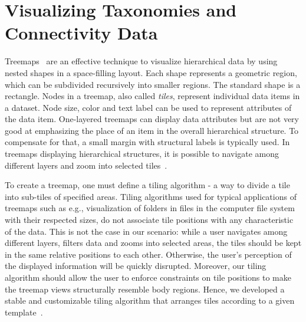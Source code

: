 \section{Visualizing Taxonomies and Connectivity Data} \label{sect:visualization}        %

Treemaps~\cite{JS91} are an effective technique to visualize hierarchical data by using nested shapes in a space-filling layout.
Each shape represents a geometric region, which can be subdivided recursively into smaller regions. The standard shape is a rectangle.
Nodes in a treemap, also called \emph{tiles}, represent individual data items in a dataset. Node size, color and text label can be used to represent attributes of the data item. One-layered treemaps can display data attributes but are not very good at emphasizing the place of an item in the overall hierarchical structure. To compensate for that, a small margin with structural labels is typically used. In treemaps displaying hierarchical structures, it is possible to navigate among different layers and zoom into selected tiles~\cite{BL07}.


To create a treemap, one must define a tiling algorithm - a way to divide a tile into sub-tiles of specified areas.
Tiling algorithms used for typical applications of treemaps such as e.g., visualization of folders in files in the computer file system with their respected sizes, do not associate tile positions with any characteristic of the data. This is not the case in our scenario: while a user navigates among different layers, filters data and zooms into selected areas, the tiles should be kept in the same relative positions to each other. Otherwise, the user's perception of the displayed information will be quickly disrupted. Moreover, our tiling algorithm should allow the user to enforce constraints on tile positions to make the treemap views structurally resemble body regions. Hence, we developed a stable and customizable tiling algorithm that arranges tiles according to a given template~\cite{KBK14}.

